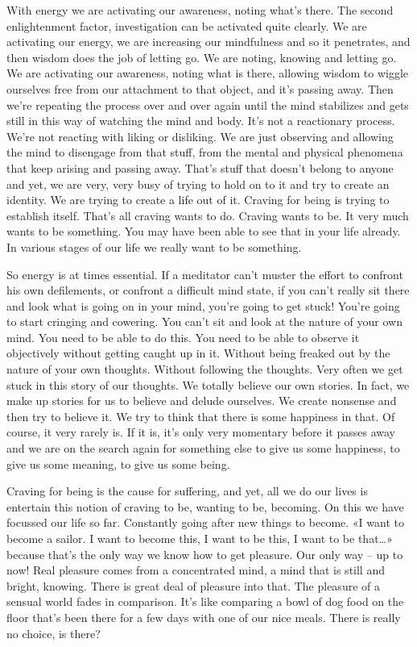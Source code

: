 \documentclass[letterpaper,10pt,english]{sphinxmanual}
\begin{document}
\sphinxAtStartPar
With energy we are activating our awareness, noting what’s there. The
second enlightenment factor, investigation can be activated quite clearly. We
are activating our energy, we are increasing our mindfulness and so it penetrates, and then wisdom does the job of letting go. We are noting, knowing
and letting go. We are activating our awareness, noting what is there, allowing wisdom to wiggle ourselves free from our attachment to that object, and
  it’s passing away. Then we’re repeating the process over and over again until
the mind stabilizes and gets still in this way of watching the mind and body.
It’s not a reactionary process. We’re not reacting with liking or disliking. We
are just observing and allowing the mind to disengage from that stuff, from
the  mental  and  physical  phenomena  that  keep  arising  and  passing  away.
That’s stuff that doesn’t belong to anyone and yet, we are very, very busy of
trying to hold on to it and try to create an identity. We are trying to create a
life out of it. Craving for being is trying to establish itself. That’s all craving
wants to do. Craving wants to be. It very much wants to be something. You
may have been able to see that in your life already. In various stages of our
life we really want to be something.

\sphinxAtStartPar
So energy is at times essential. If a meditator can’t muster the effort to
confront his own defilements, or confront a difficult mind state, if you can’t
really sit there and look what is going on in your mind, you’re going to get
stuck! You’re  going  to  start  cringing  and  cowering. You  can’t  sit  and  look
at the nature of your own mind. You need to be able to do this. You need
to be able to observe it objectively without getting caught up in it. Without
being freaked out by the nature of your own thoughts. Without following the
thoughts. Very often we get stuck in this story of our thoughts. We totally
believe  our  own  stories.  In  fact,  we  make  up  stories  for  us  to  believe  and
delude ourselves. We create nonsense and then try to believe it. We try to
think that there is some happiness in that. Of course, it very rarely is. If it
is, it’s only very momentary before it passes away and we are on the search
again for something else to give us some happiness, to give us some meaning, to give us some being.

\sphinxAtStartPar
Craving for being is the cause for suffering, and yet, all we do our lives
is entertain this notion of craving to be, wanting to be, becoming. On this we
have focussed our life so far. Constantly going after new things to become.
«I want to become a sailor. I want to become this, I want to be this, I want
to  be  that…»  because  that’s  the  only  way  we  know  how  to  get  pleasure.
Our only way – up to now! Real pleasure comes from a concentrated mind,
a mind that is still and bright, knowing. There is great deal of pleasure into
that. The pleasure of a sensual world fades in comparison. It’s like comparing a bowl of dog food on the floor that’s been there for a few days with one
  of our nice meals. There is really no choice, is there?
\end{document}

